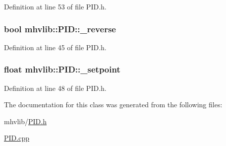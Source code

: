 Definition at line 53 of file P\-I\-D.\-h.

\hypertarget{classmhvlib_1_1_p_i_d_a4f734792b8105b3b5c1ec412d934fcf2}{
\subsubsection[{\-\_\-reverse}]{\setlength{\rightskip}{0pt plus 5cm}bool mhvlib\-::\-P\-I\-D\-::\-\_\-reverse\hspace{0.3cm}{\ttfamily [protected]}}}\label{classmhvlib_1_1_p_i_d_a4f734792b8105b3b5c1ec412d934fcf2}


Definition at line 45 of file P\-I\-D.\-h.

\hypertarget{classmhvlib_1_1_p_i_d_a51556d4248979a704496105b1fe9dc8c}{
\subsubsection[{\-\_\-setpoint}]{\setlength{\rightskip}{0pt plus 5cm}float mhvlib\-::\-P\-I\-D\-::\-\_\-setpoint\hspace{0.3cm}{\ttfamily [protected]}}}\label{classmhvlib_1_1_p_i_d_a51556d4248979a704496105b1fe9dc8c}


Definition at line 48 of file P\-I\-D.\-h.



The documentation for this class was generated from the following files\-:\begin{DoxyCompactItemize}
\item 
mhvlib/\hyperlink{_p_i_d_8h}{P\-I\-D.\-h}\item 
\hyperlink{_p_i_d_8cpp}{P\-I\-D.\-cpp}\end{DoxyCompactItemize}
